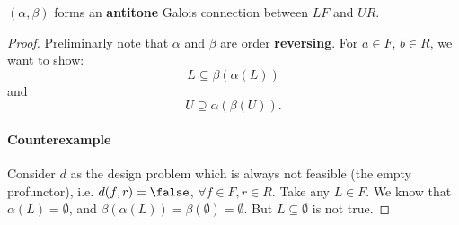 

\begin{lemma} $(\alpha, \beta)$ forms an  \textbf{antitone} Galois connection between $LF$ and $UR$.
\end{lemma}
\begin{proof}
Preliminarly note that $\alpha$ and $\beta$ are order \textbf{reversing}. For $a\in F$, $b\in R$, we want to show:
\begin{equation}
\label{eq:alfabetafirst}
    L\subseteq \beta(\alpha(L))
\end{equation}
and
\begin{equation}
\label{eq:alfabetasec}
     U\supseteq \alpha(\beta(U)).
\end{equation}
\paragraph{Counterexample} Consider $d$ as the design problem which is always not feasible (the empty profunctor), i.e. $d(f,r)=\false$, $\forall f\in F,r\in R$. Take any $L\in F$. We know that $\alpha(L)=\emptyset$, and $\beta(\alpha(L))=\beta(\emptyset)=\emptyset$. But $L\subseteq \emptyset$ is not true.

\begin{comment}
Or ...
\begin{itemize}
    \item \cref{eq:alfabetafirst} means that $x\in L \Rightarrow x \in \beta(\alpha(L))$. Let's check this. Given $x\in L$, we know that $y\in \alpha(x)$ if $\exists f\in x$ such that $d(f,y)=\true$. Furthermore, we know that $z\in \beta(\alpha(x))$ if $\exists r\in \alpha(x)$ such that $d(z,r)=\true$. We know that for all $r\in \alpha(x)$, there exists a $f\in x$ such that $d(f,r)=\true$, so at least $f\in \beta(\alpha(x))$. 
    \todo{how to generalize?}
    \item \cref{eq:alfabetasec} means that $x\in \alpha(\beta(U))\Imp x\in U$. Let's check this. Given $x\in U$, we know that $y\in \beta(x)$ if $\exists r\in x$ such that $d(y,r)=\true$. Furthermore, we know that $z\in \alpha(\beta(x))$ if $\exists f\in \beta(x)$ such that $d(f,z)=\true$. We know that for all $f\in \beta(x)$, there exists a $r\in x$ such that $d(f,r)=\true$, so at least $r\in \beta(\alpha(x))$.
    \todo{how to generalize}
\end{itemize}
\end{comment}

\end{proof}






